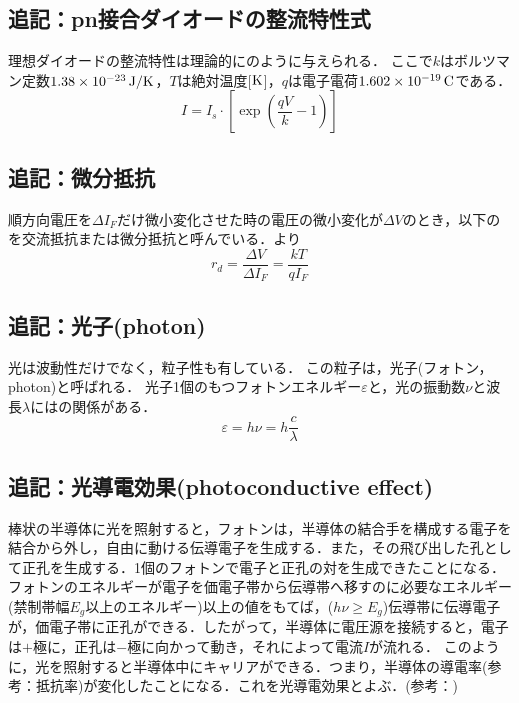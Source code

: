 \subsection{追記：pn接合ダイオードの整流特性式\cite{jsdfvl}\cite{113000079590612}}
理想ダイオードの整流特性は理論的にのように与えられる．
ここで$k$はボルツマン定数$1.38\times 10^{-23}\,\rm{J/K}$，$T$は絶対温度[$\rm{K}$]，$q$は電子電荷$1.602\times 10^{-19}\,\rm{C}$である．
\begin{equation}
I=I_{s} \cdot \left[\exp \left(\frac{qV}{k}-1\right)\right ]
\label{eq:exp}
\end{equation}

\subsection{追記：微分抵抗\cite{113000079590612}}
順方向電圧を$\Delta I_{F}$だけ微小変化させた時の電圧の微小変化が$\Delta V$のとき，以下のを交流抵抗または微分抵抗と呼んでいる．より
\begin{equation}
r_{d}=\frac{\Delta V}{\Delta I_{F}}=\frac{kT}{qI_{F}}
\label{eq:diff}
\end{equation}

\subsection{追記：光子(photon)\cite{1130003902054832640}}
光は波動性だけでなく，粒子性も有している．
この粒子は，光子(フォトン，photon)と呼ばれる．
光子1個のもつフォトンエネルギー$\varepsilon$と，光の振動数$\nu$と波長$\lambda$にはの関係がある．
\begin{equation}
	\varepsilon = h \nu =h\frac{c}{\lambda}
	\label{eq:epsion}
\end{equation}

\subsection{追記：光導電効果(photoconductive effect)\cite{11300039054832640}}
棒状の半導体に光を照射すると，フォトンは，半導体の結合手を構成する電子を結合から外し，自由に動ける伝導電子を生成する．また，その飛び出した孔として正孔を生成する．1個のフォトンで電子と正孔の対を生成できたことになる．
フォトンのエネルギーが電子を価電子帯から伝導帯へ移すのに必要なエネルギー(禁制帯幅$E_{g}$以上のエネルギー)以上の値をもてば，($h\nu \geq E_{g}$)伝導帯に伝導電子が，価電子帯に正孔ができる．したがって，半導体に電圧源を接続すると，電子は$+$極に，正孔は$-$極に向かって動き，それによって電流$I$が流れる．
このように，光を照射すると半導体中にキャリアができる．つまり，半導体の導電率(参考：抵抗率)が変化したことになる．これを光導電効果とよぶ．(参考：)

